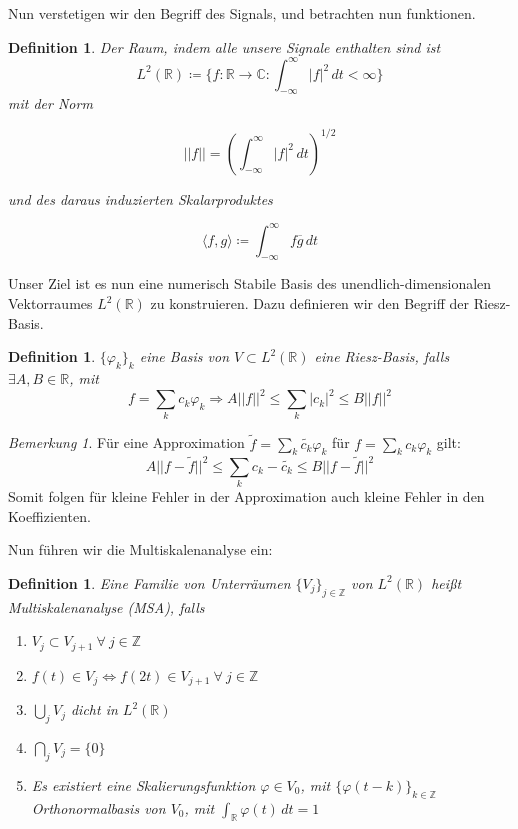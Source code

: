 \documentclass[]{scrartcl}
\theoremstyle{plain}
\newtheorem{defn}[theo]{Definition}
\theoremstyle{remark}
\newtheorem*{bem}{Bemerkung}
\newcommand{\lR}{L^2(\mathbb{R})}
\begin{document}
    Nun verstetigen wir den Begriff des Signals, und betrachten nun funktionen.

    \begin{defn} Der Raum, indem alle unsere Signale enthalten sind ist
        $$
        L^2(\mathbb{R}) \coloneqq \{f: \mathbb{R} \to \mathbb{C}:
        \int_{-\infty}^\infty |f|^2 \, dt < \infty\}
        $$
        mit der Norm

        $$||f|| = (\int_{-\infty}^\infty |f|^2 \, dt)^{1/2}$$

        und des daraus induzierten Skalarproduktes

        $$\langle f, g \rangle \coloneqq \int_{-\infty}^\infty f \overline{g} \, dt$$
    \end{defn}

    Unser Ziel ist es nun eine numerisch Stabile Basis des unendlich-dimensionalen Vektorraumes $L^2(\mathbb{R})$ zu konstruieren. Dazu definieren wir den Begriff der Riesz-Basis.

    \begin{defn}
        $\{\varphi_k\}_k$ eine Basis von $V \subset \lR$ eine Riesz-Basis, falls 
        $\exists A, B \in \mathbb{R}$, mit
        $$f = \sum_k c_k \varphi_k \Rightarrow A ||f||^2 \le \sum_k |c_k|^2 \le B ||f||^2$$
    \end{defn}

    \begin{bem}
        Für eine Approximation $\tilde{f} = \sum_k \tilde{c_k} \varphi_k$ für $f = \sum_k c_k \varphi_k$ gilt:
        $$A||f-\tilde{f}||^2 \le \sum_k c_k - \tilde{c_k} \le B ||f - \tilde{f}||^2$$
        Somit folgen für kleine Fehler in der Approximation auch kleine Fehler in den Koeffizienten.  
    \end{bem}

    Nun führen wir die Multiskalenanalyse ein:

    \begin{defn}
        Eine Familie von Unterräumen $\{V_j\}_{j \in \mathbb{Z}}$ von $\lR$  heißt \emph{Multiskalenanalyse} (MSA), falls

        \begin{enumerate}[label=(\roman*)]
            \item $V_j \subset V_{j+1} \: \forall \: j \in \mathbb{Z}$ \label{MSA:i}
            \item $f(t) \in V_j \Leftrightarrow f(2t) \in V_{j+1} \: \forall \: j \in \mathbb{Z}$ \label{MSA:ii}
            \item $\bigcup_j V_j$ dicht in $L^2(\mathbb{R})$ \label{MSA:iii}
            \item $\bigcap_j V_j = \{ 0 \}$ 
            \item Es existiert eine Skalierungsfunktion $\varphi \in V_0$, mit $\{\varphi (t - k)\}_{k \in \mathbb{Z}}$ Orthonormalbasis von $V_0$, mit 
            $\int_\mathbb{R} \varphi(t) \, dt = 1$ \label{MSA:v}
        \end{enumerate}
    \end{defn}
\end{document}

